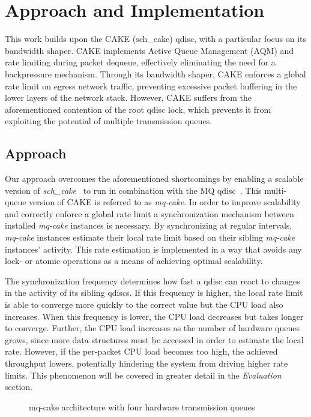 \section{Approach and Implementation}
This work builds upon the CAKE (sch\_cake) qdisc, with a particular focus on its bandwidth shaper. CAKE implements Active Queue Management (AQM) and rate limiting during packet dequeue, effectively eliminating the need for a backpressure mechanism. Through its bandwidth shaper, CAKE enforces a global rate limit on egress network traffic, preventing excessive packet buffering in the lower layers of the network stack. However, CAKE suffers from the aforementioned contention of the root qdisc lock, which prevents it from exploiting the potential of multiple transmission queues.

\subsection{Approach}
Our approach overcomes the aforementioned shortcomings by enabling a scalable version of \textit{sch\_cake}~\cite{cake} to run in combination with the MQ qdisc~\cite{mq}.
%
This multi-queue version of CAKE is referred to as \textit{mq-cake}.
In order to improve scalability and correctly enforce a global rate limit a synchronization mechanism between installed \textit{mq-cake} instances is necessary.
%
By synchronizing at regular intervals, \textit{mq-cake} instances estimate their local rate limit based on their sibling \textit{mq-cake} instances' activity.  
%
This rate estimation is implemented in a way that avoids any lock- or atomic operations as a means of achieving optimal scalability.
%

The synchronization frequency determines how fast a qdisc can react to changes in the activity of its sibling qdiscs.
If this frequency is higher, the local rate limit is able to converge more quickly to the correct value but the CPU load also increases.
When this frequency is lower, the CPU load decreases but takes longer to converge.
%
Further, the CPU load increases as the number of hardware queues grows, since more data structures must be accessed in order to estimate the local rate.
%
However, if the per-packet CPU load becomes too high, the achieved throughput lowers, potentially hindering the system from driving higher rate limits.
This phenomenon will be covered in greater detail in the \textit{Evaluation} section.

\begin{figure}[h]
    \centering
    
    \caption{mq-cake architecture with four hardware transmission queues}\label{fig:mq_cake_architecture}
\end{figure}

